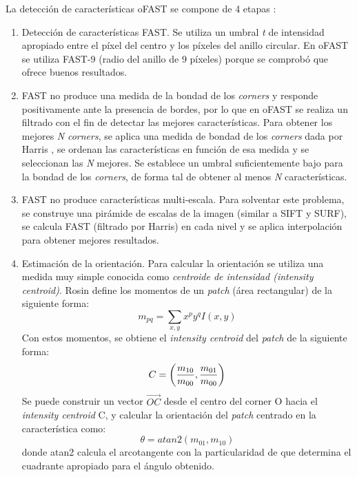 La detección de características oFAST se compone de 4 etapas :
\begin{enumerate}

\item Detección de características FAST. Se utiliza un umbral \textsl{t} de intensidad apropiado entre el píxel del centro y los píxeles del anillo circular. En oFAST se utiliza FAST-9 (radio del anillo de 9 píxeles) porque se comprobó que ofrece buenos resultados.

\item FAST no produce una medida de la bondad de los \textit{corners} y responde positivamente ante la presencia de bordes, por lo que en oFAST se realiza un filtrado con el fin de detectar las mejores características. Para obtener los mejores \textsl{N} \textit{corners}, se aplica una medida de bondad de los \textit{corners} dada por Harris \cite{Harris88alvey}, se ordenan las características en función de esa medida y se seleccionan las \textsl{N} mejores. Se establece un umbral suficientemente bajo para la bondad de los \textit{corners}, de forma tal de obtener al menos \textsl{N} características.

\item FAST no produce características multi-escala. Para solventar este problema, se construye una pirámide de escalas de la imagen (similar a SIFT y SURF), se calcula FAST (filtrado por Harris) en cada nivel y se aplica interpolación para obtener mejores resultados.

\item Estimación de la orientación. Para calcular la orientación se utiliza una medida muy simple conocida como \textit{centroide de intensidad (intensity centroid)}. Rosin \cite{Rosin99measuringcorner} define los momentos de un \textit{patch} (área rectangular) de la siguiente forma:
\begin{equation}
m_{pq} = \sum_{x,y} x^{p}y^{q}I(x,y)
\end{equation}
Con estos momentos, se obtiene el \textit{intensity centroid} del \textit{patch} de la siguiente forma:
\begin{equation}
C = \left(
\frac{m_{10}}{m_{00}} , \frac{m_{01}}{m_{00}} \\
\right)
\end{equation}
Se puede construir un vector $\vec{OC}$ desde el centro del corner O hacia el \textit{intensity centroid} C, y calcular la orientación del \textit{patch} centrado en la característica como:
\begin{equation}
\theta = atan2(m_{01}, m_{10})
\end{equation}
donde atan2 calcula el arcotangente con la particularidad de que determina el cuadrante apropiado para el ángulo obtenido.

\end{enumerate}

